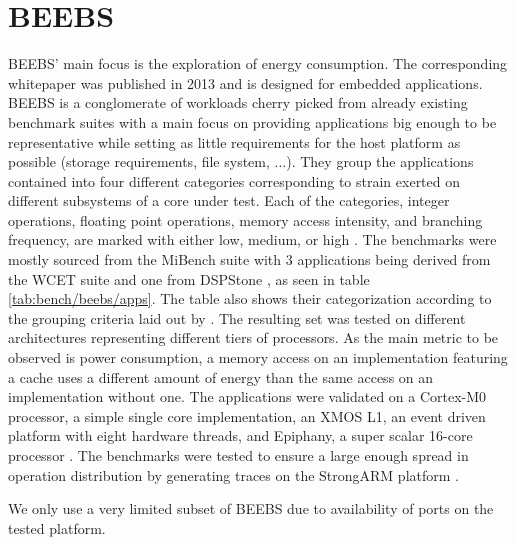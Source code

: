 \documentclass[../bachelor_paper.tex]{subfiles}
\begin{document}
\section{BEEBS}
    \label{sec:bench:beebs}
BEEBS' main focus is the exploration of energy consumption. The corresponding whitepaper was published in 2013 and is designed for embedded applications. BEEBS is a conglomerate of workloads cherry picked from already existing benchmark suites with a main focus on providing applications big enough to be representative while setting as little requirements for the host platform as possible (storage requirements, file system, ...). They group the applications contained into four different categories corresponding to strain exerted on different subsystems of a core under test. Each of the categories, integer operations, floating point operations, memory access intensity, and branching frequency, are marked with either low, medium, or high \cite{pallisterBEEBSOpenBenchmarks2013}. The benchmarks were mostly sourced from the MiBench suite \cite{guthausMiBenchFreeCommercially2001} with 3 applications being derived from the WCET suite \cite{gustafssonMalardalenWCETBenchmarks2010} and one from DSPStone \cite{zivojnovicDSPstoneDSPorientedBenchmarking1994}, as seen in table \ref{tab:bench/beebs/apps}. The table also shows their categorization according to the grouping criteria laid out by \cite{pallisterBEEBSOpenBenchmarks2013}. The resulting set was tested on different architectures representing different tiers of processors. As the main metric to be observed is power consumption, a memory access on an implementation featuring a cache uses a different amount of energy than the same access on an implementation without one. The applications were validated on a Cortex-M0 processor, a simple single core implementation, an XMOS L1, an event driven platform with eight hardware threads, and Epiphany, a super scalar 16-core processor \cite{pallisterBEEBSOpenBenchmarks2013}. The benchmarks were tested to ensure a large enough spread in operation distribution by generating traces on the StrongARM platform \cite{pallisterBEEBSOpenBenchmarks2013}.

We only use a very limited subset of BEEBS due to availability of ports on the tested platform.
\end{document}

